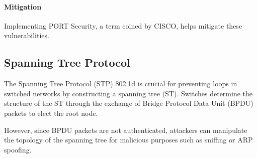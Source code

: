 \paragraph*{Mitigation}
Implementing PORT Security, a term coined by CISCO, helps mitigate these vulnerabilities.

\subsection{Spanning Tree Protocol}
The Spanning Tree Protocol (STP) 802.1d is crucial for preventing loops in switched networks by constructing a spanning tree (ST). 
Switches determine the structure of the ST through the exchange of Bridge Protocol Data Unit (BPDU) packets to elect the root node.

However, since BPDU packets are not authenticated, attackers can manipulate the topology of the spanning tree for malicious purposes such as sniffing or ARP spoofing.
